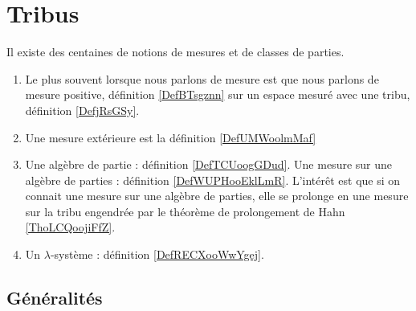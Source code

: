 

\section{Tribus}

Il existe des centaines de notions de mesures et de classes de parties.
\begin{enumerate}
    \item
        Le plus souvent lorsque nous parlons de mesure est que nous parlons de mesure positive, définition \ref{DefBTsgznn} sur un espace mesuré avec une tribu, définition \ref{DefjRsGSy}.
    \item
        Une mesure extérieure est la définition \ref{DefUMWoolmMaf}
    \item 
        Une algèbre de partie : définition \ref{DefTCUoogGDud}. Une mesure sur une algèbre de parties : définition \ref{DefWUPHooEklLmR}. L'intérêt est que si on connait une mesure sur une algèbre de parties, elle se prolonge en une mesure sur la tribu engendrée par le théorème de prolongement de Hahn \ref{ThoLCQoojiFfZ}.
    \item
        Un \( \lambda\)-système : définition \ref{DefRECXooWwYgej}.
\end{enumerate}

\subsection{Généralités}

